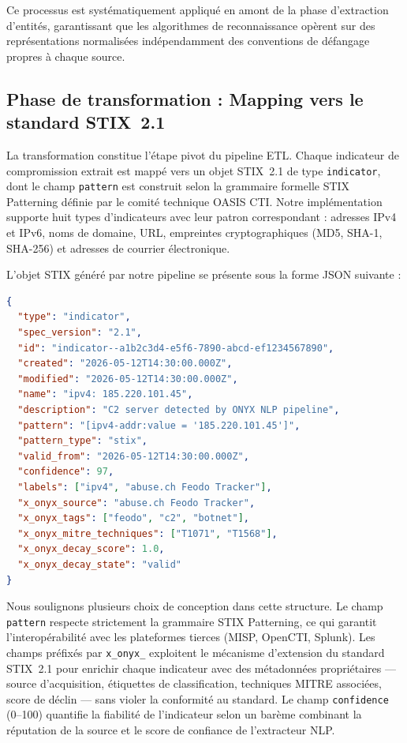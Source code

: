 Ce processus est systématiquement appliqué en amont de la phase d'extraction d'entités, garantissant que les algorithmes de reconnaissance opèrent sur des représentations normalisées indépendamment des conventions de défangage propres à chaque source.

\subsection{Phase de transformation : Mapping vers le standard STIX~2.1}

La transformation constitue l'étape pivot du pipeline ETL. Chaque indicateur de compromission extrait est mappé vers un objet STIX~2.1 de type \texttt{indicator}, dont le champ \texttt{pattern} est construit selon la grammaire formelle STIX Patterning définie par le comité technique OASIS CTI. Notre implémentation supporte huit types d'indicateurs avec leur patron correspondant : adresses IPv4 et IPv6, noms de domaine, URL, empreintes cryptographiques (MD5, SHA-1, SHA-256) et adresses de courrier électronique.

L'objet STIX généré par notre pipeline se présente sous la forme JSON suivante :

\begin{lstlisting}[language=json, caption={Objet STIX~2.1 de type \texttt{indicator} généré par le pipeline ONYX.}, label={lst:stix-json}]
{
  "type": "indicator",
  "spec_version": "2.1",
  "id": "indicator--a1b2c3d4-e5f6-7890-abcd-ef1234567890",
  "created": "2026-05-12T14:30:00.000Z",
  "modified": "2026-05-12T14:30:00.000Z",
  "name": "ipv4: 185.220.101.45",
  "description": "C2 server detected by ONYX NLP pipeline",
  "pattern": "[ipv4-addr:value = '185.220.101.45']",
  "pattern_type": "stix",
  "valid_from": "2026-05-12T14:30:00.000Z",
  "confidence": 97,
  "labels": ["ipv4", "abuse.ch Feodo Tracker"],
  "x_onyx_source": "abuse.ch Feodo Tracker",
  "x_onyx_tags": ["feodo", "c2", "botnet"],
  "x_onyx_mitre_techniques": ["T1071", "T1568"],
  "x_onyx_decay_score": 1.0,
  "x_onyx_decay_state": "valid"
}
\end{lstlisting}

Nous soulignons plusieurs choix de conception dans cette structure. Le champ \texttt{pattern} respecte strictement la grammaire STIX Patterning, ce qui garantit l'interopérabilité avec les plateformes tierces (MISP, OpenCTI, Splunk). Les champs préfixés par \texttt{x\_onyx\_} exploitent le mécanisme d'extension du standard STIX~2.1 pour enrichir chaque indicateur avec des métadonnées propriétaires --- source d'acquisition, étiquettes de classification, techniques MITRE associées, score de déclin --- sans violer la conformité au standard. Le champ \texttt{confidence} (0--100) quantifie la fiabilité de l'indicateur selon un barème combinant la réputation de la source et le score de confiance de l'extracteur NLP.

